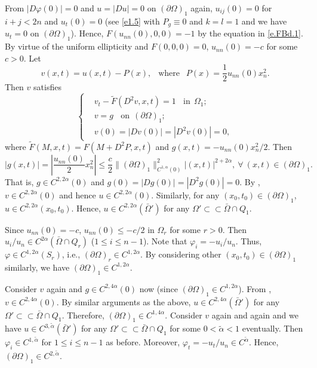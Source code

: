\documentclass[preprint,12pt]{elsarticle}
\theoremstyle{definition}
\theoremstyle{remark}
\numberwithin{equation}{section}
\begin{document}
From $|D\varphi(0)|=0$ and $u=|Du|=0$ on $(\partial \Omega)_1$ again, $u_{ij}(0)=0$ for $i+j<2n$ and $u_t(0)=0$ (see \cref{e1.5} with $P_g\equiv 0$ and $k=l=1$ and we have $u_t=0$ on $(\partial \Omega)_1$). Hence, $F(u_{nn}(0),0,0)=-1$ by the equation in \cref{e.FBd.1}. By virtue of the uniform ellipticity and $F(0,0,0)=0$, $u_{nn}(0)=-c$ for some $c>0$. Let
\begin{equation*}
v(x,t)=u(x,t)-P(x),~~\mbox{ where }~~P(x)=\frac{1}{2}u_{nn}(0)x_n^2.
\end{equation*}
Then $v$ satisfies
\begin{equation*}
\left\{\begin{aligned}
&   v_t-\tilde{F} (D^2v,x,t)=1~~~~\mbox{in}~~\Omega_1;\\
&   v=g~~~~\mbox{on}~~(\partial \Omega)_1;\\
&   v(0)=|Dv(0)|=|D^2v(0)|=0,
\end{aligned}\right.
\end{equation*}
where $\tilde{F}(M,x,t)=F(M+D^2P,x,t)$ and $g(x,t)=-u_{nn}(0)x_n^2/2$. Then
\begin{equation*}
|g(x,t)|=\left|\frac{u_{nn}(0)}{2}x_n^2 \right|\leq \frac{c}{2}\|(\partial \Omega)_1\|_{C^{1,\alpha}(0)}^2|(x,t)|^{2+2\alpha},~\forall ~(x,t)\in (\partial \Omega)_1.
\end{equation*}
That is, $g\in C^{2,2\alpha}(0)$ and $g(0)=|Dg(0)|=|D^2g(0)|=0$. By , $v\in C^{2,2\alpha}(0)$ and hence $u\in C^{2,2\alpha}(0)$. Similarly, for any $(x_0,t_0)\in (\partial \Omega)_1$, $u\in C^{2,2\alpha}(x_0,t_0)$. Hence, $u\in C^{2,2\alpha}(\bar\Omega')$ for any $\Omega'\subset\subset \bar\Omega\cap Q_1$.

Since $u_{nn}(0)=-c$, $u_{nn}(0)\leq -c/2$ in $\Omega_r$ for some $r>0$. Then $u_i/u_n\in C^{2\alpha} (\bar\Omega\cap Q_{r})$ ($1\leq i\leq n-1$). Note that $\varphi_i=-u_i/u_n$. Thus, $\varphi\in C^{1,2\alpha}(S_r)$, i.e., $(\partial \Omega)_r\in C^{1,2\alpha}$. By considering other $(x_0, t_0)\in (\partial \Omega)_1$ similarly, we have $(\partial\Omega)_1\in C^{1,2\alpha}$.

Consider $v$ again and $g\in C^{2,4\alpha}(0)$ now (since $(\partial\Omega)_1\in C^{1,2\alpha}$). From , $v\in C^{2,4\alpha}(0)$. By similar arguments as the above, $u\in C^{2,4\alpha}(\bar\Omega')$ for any $\Omega'\subset\subset \bar{\Omega}\cap Q_1$. Therefore, $(\partial \Omega)_1\in C^{1, 4\alpha}$. Consider $v$ again and again and we have
$u\in C^{3,\tilde{\alpha}}(\bar\Omega')$ for any $\Omega'\subset\subset \bar{\Omega}\cap Q_1$ for some $0<\tilde{\alpha}<1$ eventually. Then $\varphi_i\in C^{1,\tilde{\alpha}}$ for $1\leq i\leq n-1$ as before. Moreover, $\varphi_t=-u_t/u_n\in C^{\tilde{\alpha}}$. Hence, $(\partial \Omega)_1\in C^{2,\tilde{\alpha}}$.
\end{document}

